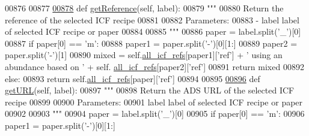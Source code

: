 \begin{DoxyCode}
{{{00876    
00877     
\hypertarget{icf_8py_source_l00878}{}\hyperlink{classpyneb_1_1core_1_1icf_1_1_i_c_f_a6dd48b2037e45deb624effc6ac91c841}{00878}     \textcolor{keyword}{def }\hyperlink{classpyneb_1_1core_1_1icf_1_1_i_c_f_a6dd48b2037e45deb624effc6ac91c841}{getReference}(self, label): 
00879         \textcolor{stringliteral}{""" }
00880 \textcolor{stringliteral}{        Return the reference of the selected ICF recipe }
00881 \textcolor{stringliteral}{        }
00882 \textcolor{stringliteral}{        Parameters:}
00883 \textcolor{stringliteral}{            - label    label of selected ICF recipe or paper}
00884 \textcolor{stringliteral}{}
00885 \textcolor{stringliteral}{        """}        
00886         paper = label.split(\textcolor{stringliteral}{'\_'})[0]
00887         \textcolor{keywordflow}{if} paper[0] == \textcolor{stringliteral}{'m'}:
00888             paper1 = paper.split(\textcolor{stringliteral}{'-'})[0][1:]
00889             paper2 = paper.split(\textcolor{stringliteral}{'-'})[1]
00890             mixed = self.\hyperlink{classpyneb_1_1core_1_1icf_1_1_i_c_f_a9777abc7cc843cd5c4d8c5810c1b2ed1}{all\_icf\_refs}[paper1][\textcolor{stringliteral}{'ref'}] + \textcolor{stringliteral}{' using an abundance based on '} + self.
      \hyperlink{classpyneb_1_1core_1_1icf_1_1_i_c_f_a9777abc7cc843cd5c4d8c5810c1b2ed1}{all\_icf\_refs}[paper2][\textcolor{stringliteral}{'ref'}]
00891             \textcolor{keywordflow}{return} mixed
00892         \textcolor{keywordflow}{else}:
00893             \textcolor{keywordflow}{return} self.\hyperlink{classpyneb_1_1core_1_1icf_1_1_i_c_f_a9777abc7cc843cd5c4d8c5810c1b2ed1}{all\_icf\_refs}[paper][\textcolor{stringliteral}{'ref'}]
00894    
00895     
\hypertarget{icf_8py_source_l00896}{}\hyperlink{classpyneb_1_1core_1_1icf_1_1_i_c_f_a838ffba1ba395f7039a8f80eab6c46d2}{00896}     \textcolor{keyword}{def }\hyperlink{classpyneb_1_1core_1_1icf_1_1_i_c_f_a838ffba1ba395f7039a8f80eab6c46d2}{getURL}(self, label): 
00897         \textcolor{stringliteral}{""" }
00898 \textcolor{stringliteral}{        Return the ADS URL of the selected ICF recipe }
00899 \textcolor{stringliteral}{        }
00900 \textcolor{stringliteral}{        Parameters:}
00901 \textcolor{stringliteral}{            label    label of selected ICF recipe or paper}
00902 \textcolor{stringliteral}{}
00903 \textcolor{stringliteral}{        """}        
00904         paper = label.split(\textcolor{stringliteral}{'\_'})[0]
00905         \textcolor{keywordflow}{if} paper[0] == \textcolor{stringliteral}{'m'}:
00906             paper1 = paper.split(\textcolor{stringliteral}{'-'})[0][1:]
}}}
\end{DoxyCode}
